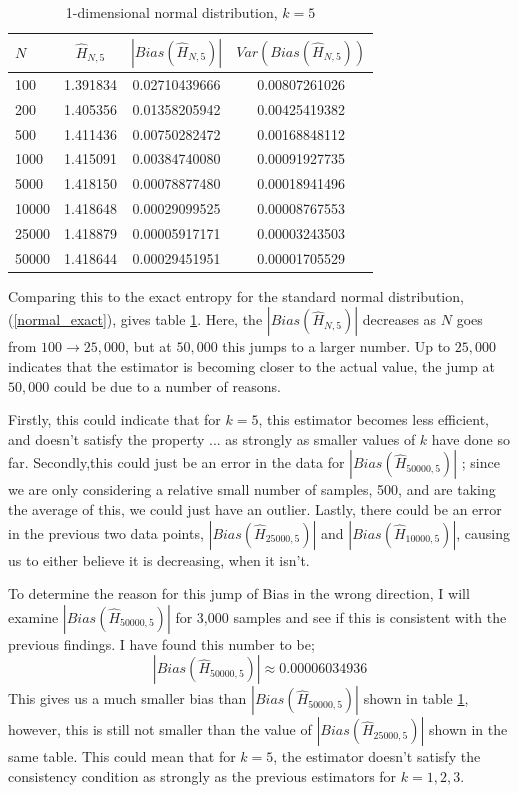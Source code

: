 \documentclass{article}
\begin{document}
\begin{table}
\caption{1-dimensional normal distribution, $k=5$} \label{normal_k=5_table}
\begin{center}
\begin{tabular}{| l | c c c|} 
\toprule
$N$ & $\hat{H}_{N, 5}$ & $|Bias(\hat{H}_{N, 5})|$ & $Var(Bias(\hat{H}_{N, 5}))$ \\
\midrule[1pt]
100     & 1.391834     & 0.02710439666     & 0.00807261026  \\
200     & 1.405356     & 0.01358205942     & 0.00425419382  \\
500     & 1.411436     & 0.00750282472     & 0.00168848112  \\
1000    & 1.415091     & 0.00384740080     & 0.00091927735  \\
5000    & 1.418150     & 0.00078877480     & 0.00018941496  \\
10000   & 1.418648     & 0.00029099525     & 0.00008767553  \\
25000   & 1.418879     & 0.00005917171     & 0.00003243503  \\
50000   & 1.418644     & 0.00029451951     & 0.00001705529  \\
\hline
\end{tabular}
\end{center}
\end{table}

Comparing this to the exact entropy for the standard normal distribution, (\ref{normal_exact}), gives table \ref{normal_k=5_table}. Here, the $|Bias(\hat{H}_{N, 5})|$ decreases as $N$ goes from $100 \to 25,000$, but at $50,000$ this jumps to a larger number. Up to $25,000$ indicates that the estimator is becoming closer to the actual value, the jump at $50,000$  could be due to a number of reasons. 

Firstly, this could indicate that for $k=5$, this estimator becomes less efficient, and doesn't satisfy the property ...  as strongly as smaller values of $k$ have done so far. Secondly,this could just be an error in the data for $|Bias(\hat{H}_{50000, 5})|$ ; since we are only considering a relative small number of samples, 500, and are taking the average of this, we could just have an outlier. Lastly, there could be an error in the previous two data points, $|Bias(\hat{H}_{25000, 5})|$ and $|Bias(\hat{H}_{10000, 5})|$, causing us to either believe it is decreasing, when it isn't.

To determine the reason for this jump of Bias in the wrong direction, I will examine $|Bias(\hat{H}_{50000, 5})|$ for 3,000 samples and see if this is consistent with the previous findings. I have found this number to be; 
\begin{equation} 
|Bias(\hat{H}_{50000, 5})|  \approx 0.00006034936 \nonumber
\end{equation}
This gives us a much smaller bias than $|Bias(\hat{H}_{50000, 5})|$ shown in table \ref{normal_k=5_table}, however, this is still not smaller than the value of $|Bias(\hat{H}_{25000, 5})|$ shown in the same table. This could mean that for $k=5$, the estimator doesn't satisfy the consistency condition as strongly as the previous estimators for $k=1, 2, 3$.
\end{document}
